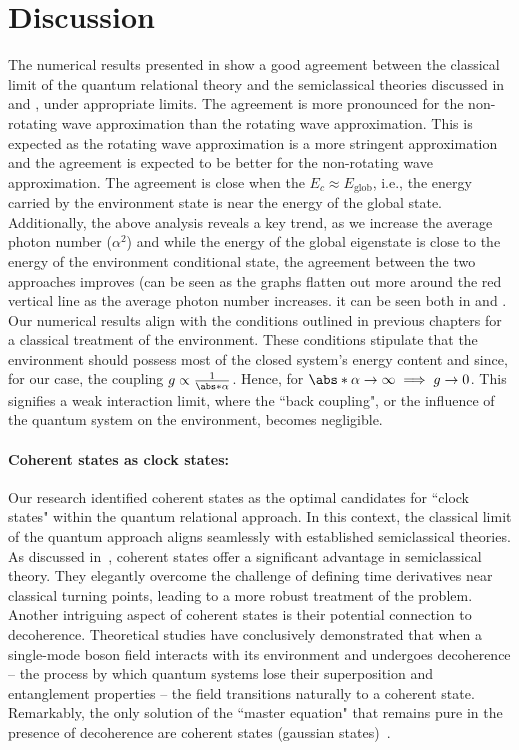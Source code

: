 \newpage 


\section{Discussion}
The numerical results presented in  show a good agreement 
between the classical limit of the quantum relational theory and the semiclassical theories
discussed in  and , under appropriate limits. 
The agreement is more pronounced for the non-rotating wave approximation than the rotating wave approximation. This is expected as the rotating wave approximation is a more stringent approximation and the
agreement is expected to be better for the non-rotating wave approximation.
The agreement is close when the \(E_c \approx E_{\mathrm{glob}}\), 
i.e., the energy carried by the environment state is near the energy of the global state. Additionally,  the above analysis reveals a key trend, as we increase the average photon number (\(\alpha^2\)) and while the energy 
of the global eigenstate
is close to the energy of the environment conditional state, the agreement between the two approaches improves (can be seen as the graphs flatten out more around the red vertical line as the average photon number increases.
it can be seen both in 
 and . 
Our numerical results align with the conditions outlined in previous chapters for a classical treatment of the environment. These conditions stipulate that the environment should possess most of the closed system's energy content and since, for our case, the coupling \(g \propto \frac{1}{\abs*{\alpha}}\). Hence, for \(\abs*{\alpha} \to \infty \implies g \to 0\). This signifies a weak interaction limit, where the ``back coupling", or the influence of the quantum system on the environment, becomes negligible.

\paragraph{Coherent states as clock states:} Our research identified coherent states as the optimal candidates for ``clock states" within the quantum relational approach. In this context, the classical limit of the quantum approach aligns seamlessly with established semiclassical theories. As discussed in~\cite{braun2004classical}, coherent states offer a significant advantage in semiclassical theory. They elegantly overcome the challenge of defining time derivatives near classical turning points, leading to a more robust treatment of the problem. 
Another intriguing aspect of coherent states is their potential connection to decoherence. Theoretical studies have conclusively demonstrated that when a single-mode boson field interacts with its environment and undergoes decoherence – the process by which quantum systems lose their superposition and entanglement properties – the field transitions naturally to a coherent state. Remarkably, the only solution of the ``master equation" that remains pure in the presence of decoherence are coherent states (gaussian states)~\cite{dutra1998decoherence, zuerk_coherent_state_1993}. 


